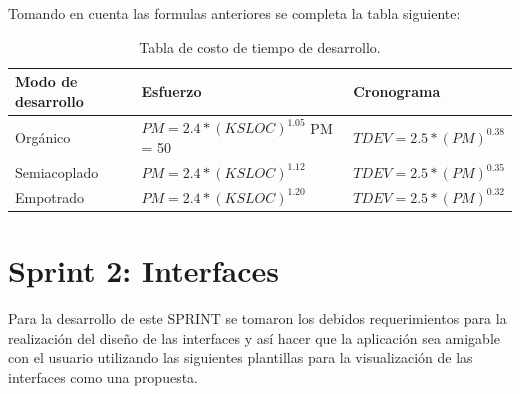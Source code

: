 	\noindent Tomando en cuenta las formulas anteriores se completa la tabla siguiente:
	
	\begin{table}[htbp]
		\begin{center}
			\begin{tabular}{|p{20mm}|p{45mm}|p{45mm}|}
				\hline
				\textbf{Modo de desarrollo}  & \textbf{Esfuerzo} & \textbf{Cronograma} \\ \hline 
				Orgánico & $ PM = 2.4 * (KSLOC)^{1.05}$  PM = 50 & $ TDEV = 2.5 * (PM)^{0.38}$  \\ \hline
				
				Semiacoplado & $ PM = 2.4 * (KSLOC)^{1.12}$ & $ TDEV = 2.5 * (PM)^{0.35}$  \\ \hline
				
				Empotrado & $ PM = 2.4 * (KSLOC)^{1.20}$ & $ TDEV = 2.5 * (PM)^{0.32}$  \\ \hline
			\end{tabular}
			\caption{Tabla de costo de tiempo de desarrollo.}
			\label{tablacocomo}
		\end{center}
	\end{table}
	
	
	\section{Sprint 2: Interfaces}
	\noindent Para la desarrollo de este SPRINT se tomaron los debidos requerimientos para la realización del diseño de las interfaces y así hacer que la aplicación sea amigable con el usuario utilizando las siguientes plantillas para la visualización de las interfaces como una propuesta.
	\newline
	
